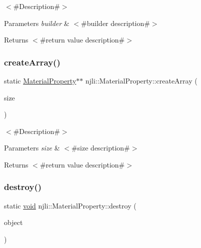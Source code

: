 $<$\#\+Description\#$>$


\begin{DoxyParams}{Parameters}
{\em builder} & $<$\#builder description\#$>$\\
\hline
\end{DoxyParams}
\begin{DoxyReturn}{Returns}
$<$\#return value description\#$>$ 
\end{DoxyReturn}
\mbox{\label{classnjli_1_1_material_property_ab1577f6ebd7e36432b326dbe37602185}} 
\subsubsection{\texorpdfstring{create\+Array()}{createArray()}}
{\footnotesize\ttfamily static \mbox{\hyperlink{classnjli_1_1_material_property}{Material\+Property}}$\ast$$\ast$ njli\+::\+Material\+Property\+::create\+Array (\begin{DoxyParamCaption}\item[{const \mbox{\hyperlink{_util_8h_a10e94b422ef0c20dcdec20d31a1f5049}{u32}}}]{size }\end{DoxyParamCaption})\hspace{0.3cm}{\ttfamily [static]}}

$<$\#\+Description\#$>$


\begin{DoxyParams}{Parameters}
{\em size} & $<$\#size description\#$>$\\
\hline
\end{DoxyParams}
\begin{DoxyReturn}{Returns}
$<$\#return value description\#$>$ 
\end{DoxyReturn}
\mbox{\label{classnjli_1_1_material_property_ae3efb73be6d8d3e1bcca27d438959fe0}} 
\subsubsection{\texorpdfstring{destroy()}{destroy()}}
{\footnotesize\ttfamily static \mbox{\hyperlink{_thread_8h_af1e856da2e658414cb2456cb6f7ebc66}{void}} njli\+::\+Material\+Property\+::destroy (\begin{DoxyParamCaption}\item[{\mbox{\hyperlink{classnjli_1_1_material_property}{Material\+Property}} $\ast$}]{object }\end{DoxyParamCaption})\hspace{0.3cm}{\ttfamily [static]}}

